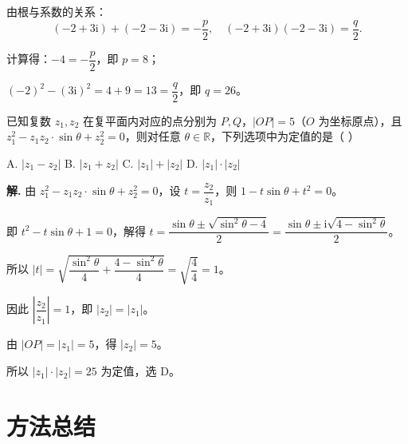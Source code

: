 \documentclass[11pt]{ctexrep}
\begin{document}
由根与系数的关系：
\[
    (-2 + 3\mathrm{i}) + (-2 - 3\mathrm{i}) = -\frac{p}{2}, \quad (-2 + 3\mathrm{i})(-2 - 3\mathrm{i}) = \frac{q}{2}.
\]

计算得：$-4 = -\dfrac{p}{2}$，即 $p = 8$；

$(-2)^2 - (3\mathrm{i})^2 = 4 + 9 = 13 = \dfrac{q}{2}$，即 $q = 26$。

\begin{realexam}[2024 闵行一模]
    已知复数 $z_1, z_2$ 在复平面内对应的点分别为 $P, Q$，$|OP| = 5$（$O$ 为坐标原点），且 $z_1^2 - z_1 z_2 \cdot \sin\theta + z_2^2 = 0$，则对任意 $\theta \in \mathbb{R}$，下列选项中为定值的是（ ）
    
    A. $|z_1 - z_2|$ \quad B. $|z_1 + z_2|$ \quad C. $|z_1| + |z_2|$ \quad D. $|z_1| \cdot |z_2|$
\end{realexam}

\textbf{解.} 由 $z_1^2 - z_1 z_2 \cdot \sin\theta + z_2^2 = 0$，设 $t = \dfrac{z_2}{z_1}$，则 $1 - t\sin\theta + t^2 = 0$。

即 $t^2 - t\sin\theta + 1 = 0$，解得 $t = \dfrac{\sin\theta \pm \sqrt{\sin^2\theta - 4}}{2} = \dfrac{\sin\theta \pm \mathrm{i}\sqrt{4 - \sin^2\theta}}{2}$。

所以 $|t| = \sqrt{\dfrac{\sin^2\theta}{4} + \dfrac{4 - \sin^2\theta}{4}} = \sqrt{\dfrac{4}{4}} = 1$。

因此 $\left|\dfrac{z_2}{z_1}\right| = 1$，即 $|z_2| = |z_1|$。

由 $|OP| = |z_1| = 5$，得 $|z_2| = 5$。

所以 $|z_1| \cdot |z_2| = 25$ 为定值，选 D。

\section*{方法总结}
\end{document}

